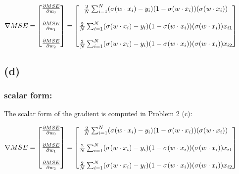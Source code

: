 \documentclass[12pt]{article}
\begin{document}
\begin{center}
    $\nabla MSE = \left[\begin{array}{@{}c@{}}
        \frac{\partial MSE}{\partial w_0} \\ \\
        \frac{\partial MSE}{\partial w_1} \\ \\
        \frac{\partial MSE}{\partial w_2} 
        \end{array} \right] = \left[\begin{array}{@{}c@{}}
            \frac{2}{N}\sum_{i=1}^{N}(\sigma(w \cdot x_i)-y_i)(1-\sigma(w \cdot x_i))(\sigma(w\cdot x_i)) \\ \\
            \frac{2}{N}\sum_{i=1}^{N}(\sigma(w \cdot x_i)-y_i)(1-\sigma(w \cdot x_i))(\sigma(w\cdot x_i))x_{i1} \\ \\ 
            \frac{2}{N}\sum_{i=1}^{N}(\sigma(w \cdot x_i)-y_i)(1-\sigma(w \cdot x_i))(\sigma(w\cdot x_i))x_{i2}
        \end{array} \right]$
\end{center}

\subsection*{(d)}
\subsubsection*{scalar form: }
The scalar form of the gradient is computed in Problem 2 (c): 
\begin{center}
    $\nabla MSE = \left[\begin{array}{@{}c@{}}
        \frac{\partial MSE}{\partial w_0} \\ \\
        \frac{\partial MSE}{\partial w_1} \\ \\
        \frac{\partial MSE}{\partial w_2} 
        \end{array} \right] = \left[\begin{array}{@{}c@{}}
            \frac{2}{N}\sum_{i=1}^{N}(\sigma(w \cdot x_i)-y_i)(1-\sigma(w \cdot x_i))(\sigma(w\cdot x_i)) \\ \\
            \frac{2}{N}\sum_{i=1}^{N}(\sigma(w \cdot x_i)-y_i)(1-\sigma(w \cdot x_i))(\sigma(w\cdot x_i))x_{i1} \\ \\ 
            \frac{2}{N}\sum_{i=1}^{N}(\sigma(w \cdot x_i)-y_i)(1-\sigma(w \cdot x_i))(\sigma(w\cdot x_i))x_{i2}
        \end{array} \right]$
\end{center}
\end{document}

